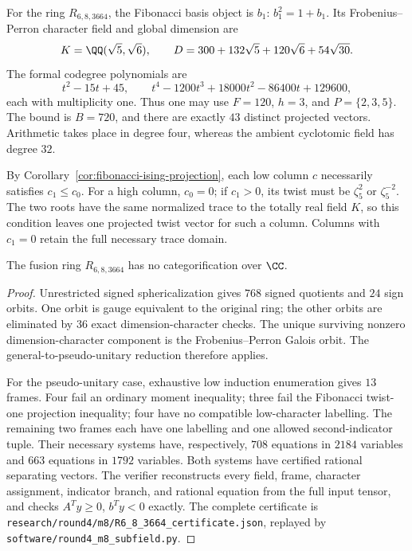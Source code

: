 For the ring $R_{6,8,3664}$, the Fibonacci basis object is $b_1$:
$b_1^2=1+b_1$.  Its Frobenius--Perron character field and global dimension
are
\[
 K=\QQ(\sqrt5,\sqrt6),\qquad
 D=300+132\sqrt5+120\sqrt6+54\sqrt{30}.
\]
The formal codegree polynomials are
\[
 t^2-15t+45,
 \qquad t^4-1200t^3+18000t^2-86400t+129600,
\]
each with multiplicity one.  Thus one may use $F=120$, $h=3$, and
$P=\{2,3,5\}$.  The bound is $B=720$, and there are exactly $43$
distinct projected vectors.  Arithmetic takes place in degree four,
whereas the ambient cyclotomic field has degree $32$.

By Corollary~\ref{cor:fibonacci-ising-projection}, each low column $c$
necessarily satisfies $c_1\leq c_0$.  For a high column, $c_0=0$;
if $c_1>0$, its twist must be $\zeta_5^{2}$ or $\zeta_5^{-2}$.
The two roots have the same normalized trace to the totally real field
$K$, so this condition leaves one projected twist vector for such a
column.  Columns with $c_1=0$ retain the full necessary trace domain.

\begin{theorem}
\label{thm:round4-3664}
The fusion ring $R_{6,8,3664}$ has no categorification over $\CC$.
\end{theorem}
\begin{proof}
Unrestricted signed sphericalization gives $768$ signed quotients and
$24$ sign orbits.  One orbit is gauge equivalent to the original ring;
the other orbits are eliminated by $36$ exact dimension-character
checks.  The unique surviving nonzero dimension-character component
is the Frobenius--Perron Galois orbit.  The general-to-pseudo-unitary
reduction therefore applies.

For the pseudo-unitary case, exhaustive low induction enumeration gives
$13$ frames.  Four fail an ordinary moment inequality; three fail the
Fibonacci twist-one projection inequality; four have no compatible
low-character labelling.  The remaining two frames each have one
labelling and one allowed second-indicator tuple.  Their necessary
systems have, respectively, $708$ equations in $2184$ variables and
$663$ equations in $1792$ variables.  Both systems have certified
rational separating vectors.  The verifier reconstructs every field,
frame, character assignment, indicator branch, and rational equation
from the full input tensor, and checks $A^Ty\geq0$, $b^Ty<0$ exactly.
The complete certificate is
\texttt{research/round4/m8/R6\_8\_3664\_certificate.json}, replayed by
\texttt{software/round4\_m8\_subfield.py}.
\end{proof}

